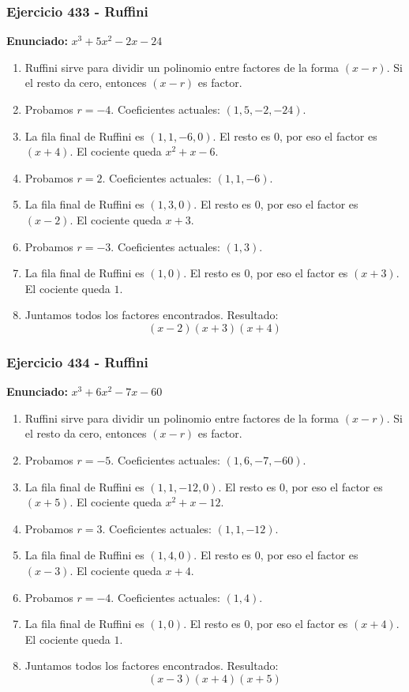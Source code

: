 \documentclass[11pt,a4paper]{article}
\begin{document}
\vspace{0.2cm}
\subsubsection*{Ejercicio 433 - Ruffini}
\textbf{Enunciado:} $ x^{3} + 5 x^{2} - 2 x - 24 $\par
\begin{enumerate}[leftmargin=2em]
\item Ruffini sirve para dividir un polinomio entre factores de la forma \((x-r)\). Si el resto da cero, entonces \((x-r)\) es factor.
\item Probamos \(r=-4\). Coeficientes actuales: \((1, 5, -2, -24)\).
\item La fila final de Ruffini es \((1, 1, -6, 0)\). El resto es \(0\), por eso el factor es \((x+4)\). El cociente queda \(x^{2} + x - 6\).
\item Probamos \(r=2\). Coeficientes actuales: \((1, 1, -6)\).
\item La fila final de Ruffini es \((1, 3, 0)\). El resto es \(0\), por eso el factor es \((x-2)\). El cociente queda \(x + 3\).
\item Probamos \(r=-3\). Coeficientes actuales: \((1, 3)\).
\item La fila final de Ruffini es \((1, 0)\). El resto es \(0\), por eso el factor es \((x+3)\). El cociente queda \(1\).
\item Juntamos todos los factores encontrados. Resultado: \[\boxed{\left(x - 2\right) \left(x + 3\right) \left(x + 4\right)}\]
\end{enumerate}

\vspace{0.2cm}
\subsubsection*{Ejercicio 434 - Ruffini}
\textbf{Enunciado:} $ x^{3} + 6 x^{2} - 7 x - 60 $\par
\begin{enumerate}[leftmargin=2em]
\item Ruffini sirve para dividir un polinomio entre factores de la forma \((x-r)\). Si el resto da cero, entonces \((x-r)\) es factor.
\item Probamos \(r=-5\). Coeficientes actuales: \((1, 6, -7, -60)\).
\item La fila final de Ruffini es \((1, 1, -12, 0)\). El resto es \(0\), por eso el factor es \((x+5)\). El cociente queda \(x^{2} + x - 12\).
\item Probamos \(r=3\). Coeficientes actuales: \((1, 1, -12)\).
\item La fila final de Ruffini es \((1, 4, 0)\). El resto es \(0\), por eso el factor es \((x-3)\). El cociente queda \(x + 4\).
\item Probamos \(r=-4\). Coeficientes actuales: \((1, 4)\).
\item La fila final de Ruffini es \((1, 0)\). El resto es \(0\), por eso el factor es \((x+4)\). El cociente queda \(1\).
\item Juntamos todos los factores encontrados. Resultado: \[\boxed{\left(x - 3\right) \left(x + 4\right) \left(x + 5\right)}\]
\end{enumerate}
\end{document}
